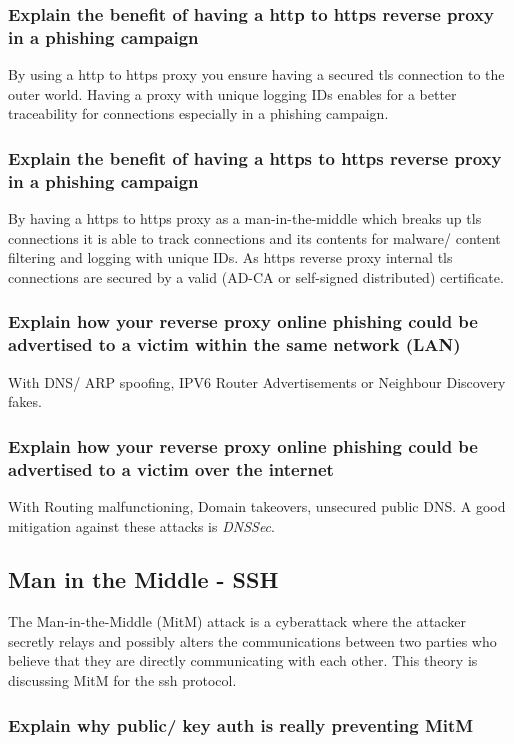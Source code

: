 \subsubsection{Explain the benefit of having a http to https reverse proxy in a phishing campaign}
By using a http to https proxy you ensure having a secured tls connection to the outer world. Having a proxy with unique logging IDs enables for a better traceability for connections especially in a phishing campaign.

\subsubsection{Explain the benefit of having a https to https reverse proxy in a phishing campaign}
By having a https to https proxy as a man-in-the-middle which breaks up tls connections it is able to track connections and its contents for malware/ content filtering and logging with unique IDs. As https reverse proxy internal tls connections are secured by a valid (AD-CA or self-signed distributed) certificate.

\subsubsection{Explain how your reverse proxy online phishing could be advertised to a victim within the same network (LAN)}
With DNS/ ARP spoofing, IPV6 Router Advertisements or Neighbour Discovery fakes.

\subsubsection{Explain how your reverse proxy online phishing could be advertised to a victim over the internet}
With Routing malfunctioning, Domain takeovers, unsecured public DNS. A good mitigation against these attacks is \textit{DNSSec}.

\subsection{Man in the Middle - SSH}
The Man-in-the-Middle (MitM) attack is a cyberattack where the attacker secretly relays and possibly alters the communications between two parties who believe that they are directly communicating with each other. This theory is discussing MitM for the ssh protocol.

\subsubsection{Explain why public/ key auth is really preventing MitM}


